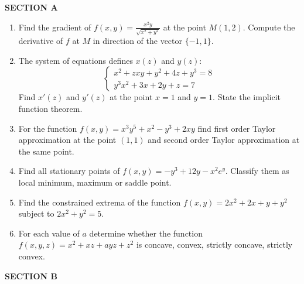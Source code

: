 \documentclass[A4,12pt]{article}
\begin{document}
\newpage

\textbf{SECTION A}

\begin{enumerate}
	\item Find the gradient of $f(x,y) =\frac{x^2y}{\sqrt{x^2+y^2}}$
at the point $M(1,2)$. Compute the derivative of $f$ at $M$ in direction of the vector $\{-1, 1\}$.
	\item The system of equations defines $x(z)$ and $y(z)$:
\begin{equation}
\begin{cases}
x^2+zxy+y^2+4z+y^3=8 \\
y^3x^2+3x+2y+z=7 \nonumber
\end{cases}
\end{equation}
Find $x'(z)$ and $y'(z)$ at the point $x=1$ and $y=1$. State the implicit function theorem.
 \item For the function $f(x,y)=x^3y^5+x^2-y^3+2xy$ find first order Taylor approximation at the point $(1,1)$ and second order Taylor approximation at the same point.
	\item Find all stationary points of $f(x,y) =-y^3+12y-x^2e^y$. Classify them as local minimum, maximum or saddle point.
	\item Find the constrained extrema of the function $f(x,y)=2x^2+2x+y+y^2$ subject to $2x^2+y^2=5$.
	\item  For each value of $a$ determine whether the function $f(x,y,z)=x^2+xz+ayz+z^2$ is concave, convex, strictly concave, strictly convex.
\end{enumerate}

\textbf{SECTION B}
\end{document}
